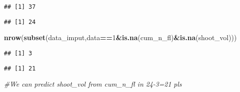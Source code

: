 \documentclass[]{article}
\newenvironment{Shaded}{\begin{snugshade}}{\end{snugshade}}
\newcommand{\KeywordTok}[1]{\textcolor[rgb]{0.13,0.29,0.53}{\textbf{#1}}}
\newcommand{\DecValTok}[1]{\textcolor[rgb]{0.00,0.00,0.81}{#1}}
\newcommand{\CommentTok}[1]{\textcolor[rgb]{0.56,0.35,0.01}{\textit{#1}}}
\newcommand{\OperatorTok}[1]{\textcolor[rgb]{0.81,0.36,0.00}{\textbf{#1}}}
\newcommand{\NormalTok}[1]{#1}
\begin{document}
\begin{verbatim}
## [1] 37
\end{verbatim}

\begin{Shaded}
\end{Shaded}

\begin{verbatim}
## [1] 24
\end{verbatim}

\begin{Shaded}
\begin{Highlighting}[]
\KeywordTok{nrow}\NormalTok{(}\KeywordTok{subset}\NormalTok{(data_imput,data}\OperatorTok{==}\DecValTok{1}\OperatorTok{&}\KeywordTok{is.na}\NormalTok{(cum_n_fl)}\OperatorTok{&}\KeywordTok{is.na}\NormalTok{(shoot_vol))) }
\end{Highlighting}
\end{Shaded}

\begin{verbatim}
## [1] 3
\end{verbatim}

\begin{Shaded}
\end{Shaded}

\begin{verbatim}
## [1] 21
\end{verbatim}

\begin{Shaded}
\begin{Highlighting}[]
\CommentTok{#We can predict shoot_vol from cum_n_fl in 24-3=21 pls}
\end{Highlighting}
\end{Shaded}
\end{document}
